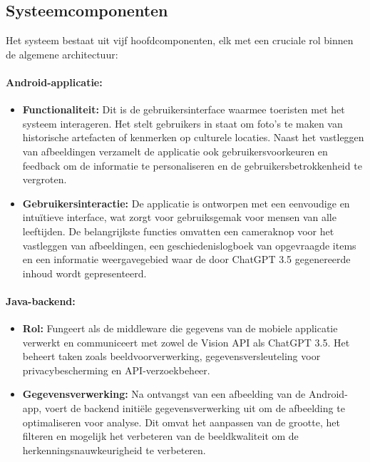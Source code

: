 \subsection{Systeemcomponenten}
Het systeem bestaat uit vijf hoofdcomponenten, elk met een cruciale rol binnen de algemene architectuur:

\paragraph{Android-applicatie:}
\begin{itemize}
    \item \textbf{Functionaliteit:} Dit is de gebruikersinterface waarmee toeristen met het systeem interageren. Het stelt gebruikers in staat om foto's te maken van historische artefacten of kenmerken op culturele locaties. Naast het vastleggen van afbeeldingen verzamelt de applicatie ook gebruikersvoorkeuren en feedback om de informatie te personaliseren en de gebruikersbetrokkenheid te vergroten.
    \item \textbf{Gebruikersinteractie:} De applicatie is ontworpen met een eenvoudige en intuïtieve interface, wat zorgt voor gebruiksgemak voor mensen van alle leeftijden. De belangrijkste functies omvatten een cameraknop voor het vastleggen van afbeeldingen, een geschiedenislogboek van opgevraagde items en een informatie weergavegebied waar de door ChatGPT 3.5 gegenereerde inhoud wordt gepresenteerd.
\end{itemize}

\paragraph{Java-backend:}
\begin{itemize}
    \item \textbf{Rol:} Fungeert als de middleware die gegevens van de mobiele applicatie verwerkt en communiceert met zowel de Vision API als ChatGPT 3.5. Het beheert taken zoals beeldvoorverwerking, gegevensversleuteling voor privacybescherming en API-verzoekbeheer.
    \item \textbf{Gegevensverwerking:} Na ontvangst van een afbeelding van de Android-app, voert de backend initiële gegevensverwerking uit om de afbeelding te optimaliseren voor analyse. Dit omvat het aanpassen van de grootte, het filteren en mogelijk het verbeteren van de beeldkwaliteit om de herkenningsnauwkeurigheid te verbeteren.
\end{itemize}

